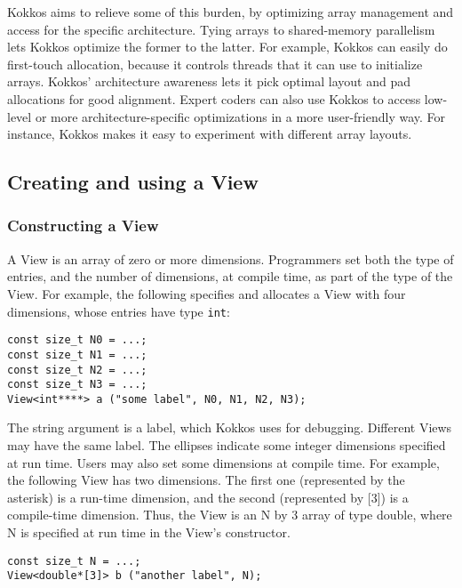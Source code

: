 Kokkos aims to relieve some of this burden, by optimizing array
management and access for the specific architecture.  Tying arrays to
shared-memory parallelism lets Kokkos optimize the former to the
latter.  For example, Kokkos can easily do first-touch allocation,
because it controls threads that it can use to initialize arrays.
Kokkos' architecture awareness lets it pick optimal layout and pad
allocations for good alignment.  Expert coders can also use Kokkos to
access low-level or more architecture-specific optimizations in a more
user-friendly way.  For instance, Kokkos makes it easy to experiment
with different array layouts.

\subsection{Creating and using a View}\label{S:View:CreateUse}

\subsubsection{Constructing a View}

A View is an array of zero or more dimensions.  Programmers set both
the type of entries, and the number of dimensions, at compile time, as
part of the type of the View.  For example, the following specifies
and allocates a View with four dimensions, whose entries have type
\texttt{int}:

\begin{lstlisting}
const size_t N0 = ...;
const size_t N1 = ...;
const size_t N2 = ...;
const size_t N3 = ...;
View<int****> a ("some label", N0, N1, N2, N3);
\end{lstlisting}

The string argument is a label, which Kokkos uses for debugging.
Different Views may have the same label.  The ellipses indicate some
integer dimensions specified at run time.  Users may also set some
dimensions at compile time.  For example, the following View has two
dimensions.  The first one (represented by the asterisk) is a run-time
dimension, and the second (represented by [3]) is a compile-time
dimension.  Thus, the View is an N by 3 array of type double, where N
is specified at run time in the View's constructor.

\begin{lstlisting}
const size_t N = ...;
View<double*[3]> b ("another label", N);
\end{lstlisting}

